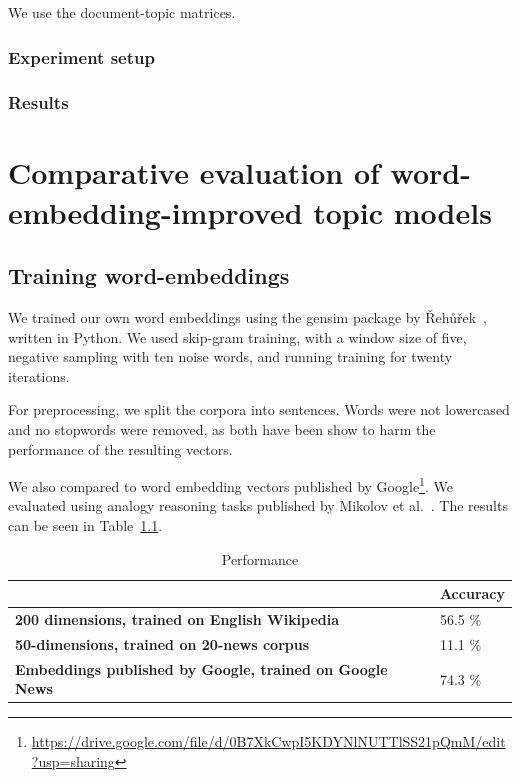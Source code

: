 \documentclass[
        a4paper,
        titlepage,
        twoside,
        parskip
        ]{scrbook}
\theoremstyle{break}
\begin{document}
We use the document-topic matrices.

\subsection{Experiment setup}
\subsection{Results}

\chapter{Comparative evaluation of word-embedding-improved topic models}
\section{Training word-embeddings}

We trained our own word embeddings using the gensim package by {\v R}eh{\r u}{\v r}ek~\cite{Rehurek2010}, written in Python.
We used skip-gram training, with a window size of five, negative sampling with ten noise words, and running training for twenty iterations.

For preprocessing, we split the corpora into sentences.
Words were not lowercased and no stopwords were removed, as both have been show to harm the performance of the resulting vectors.

We also compared to word embedding vectors published by Google\footnote{\url{https://drive.google.com/file/d/0B7XkCwpI5KDYNlNUTTlSS21pQmM/edit?usp=sharing}}.
We evaluated using analogy reasoning tasks published by Mikolov et al.~\cite{Mikolov2013}.
The results can be seen in Table~\ref{table:word_embeddings_performance}.

\begin{table}[]
  \centering
  \caption{Performance}
  \label{table:word_embeddings_performance}
  \begin{tabular}{ll}
  \hline
                                                                  & \textbf{Accuracy} \\ \hline
  \textbf{200 dimensions, trained on English Wikipedia}           & 56.5 \%           \\
  \textbf{50-dimensions, trained on 20-news corpus}               & 11.1 \%           \\
  \textbf{Embeddings published by Google, trained on Google News} & 74.3 \%
  \end{tabular}
\end{table}
\end{document}
